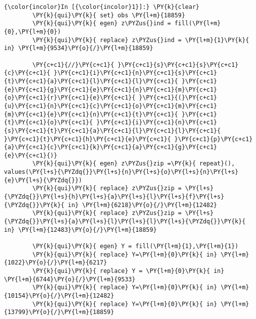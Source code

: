 \documentclass[11pt,notitlepage]{article}\usepackage[]{graphicx}\usepackage[]{color}
\makeatletter
\newenvironment{kframe}{%
 \def\at@end@of@kframe{}%
 \ifinner\ifhmode%
  \def\at@end@of@kframe{\end{minipage}}%
  \begin{minipage}{\columnwidth}%
 \fi\fi%
 \def\FrameCommand##1{\hskip\@totalleftmargin \hskip-\fboxsep
 \colorbox{shadecolor}{##1}\hskip-\fboxsep
     \hskip-\linewidth \hskip-\@totalleftmargin \hskip\columnwidth}%
 \MakeFramed {\advance\hsize-\width
   \@totalleftmargin\z@ \linewidth\hsize
   \@setminipage}}%
 {\par\unskip\endMakeFramed%
 \at@end@of@kframe}
\newenvironment{knitrout}{}{} %
\makeatother
\begin{document}
\begin{enumerate}[a)]
\begin{knitrout}
\color{fgcolor}\begin{kframe}
   \begin{Verbatim}[commandchars=\\\{\}]
{\color{incolor}In [{\color{incolor}1}]:} \PY{k}{clear} 
        \PY{k}{qui}\PY{k}{ set} obs \PY{l+m}{18859}
        \PY{k}{qui}\PY{k}{ egen} z\PYZus{}ind = fill(\PY{l+m}{0},\PY{l+m}{0})
        \PY{k}{qui}\PY{k}{ replace} z\PYZus{}ind = \PY{l+m}{1}\PY{k}{ in} \PY{l+m}{9534}\PY{o}{/}\PY{l+m}{18859}
        
        \PY{c+c1}{//}\PY{c+c1}{ }\PY{c+c1}{s}\PY{c+c1}{s}\PY{c+c1}{c}\PY{c+c1}{ }\PY{c+c1}{i}\PY{c+c1}{n}\PY{c+c1}{s}\PY{c+c1}{t}\PY{c+c1}{a}\PY{c+c1}{l}\PY{c+c1}{l}\PY{c+c1}{ }\PY{c+c1}{e}\PY{c+c1}{g}\PY{c+c1}{e}\PY{c+c1}{n}\PY{c+c1}{m}\PY{c+c1}{o}\PY{c+c1}{r}\PY{c+c1}{e}\PY{c+c1}{ }\PY{c+c1}{(}\PY{c+c1}{u}\PY{c+c1}{n}\PY{c+c1}{c}\PY{c+c1}{o}\PY{c+c1}{m}\PY{c+c1}{m}\PY{c+c1}{e}\PY{c+c1}{n}\PY{c+c1}{t}\PY{c+c1}{ }\PY{c+c1}{t}\PY{c+c1}{o}\PY{c+c1}{ }\PY{c+c1}{i}\PY{c+c1}{n}\PY{c+c1}{s}\PY{c+c1}{t}\PY{c+c1}{a}\PY{c+c1}{l}\PY{c+c1}{l}\PY{c+c1}{ }\PY{c+c1}{t}\PY{c+c1}{h}\PY{c+c1}{e}\PY{c+c1}{ }\PY{c+c1}{p}\PY{c+c1}{a}\PY{c+c1}{c}\PY{c+c1}{k}\PY{c+c1}{a}\PY{c+c1}{g}\PY{c+c1}{e}\PY{c+c1}{)}
        \PY{k}{qui}\PY{k}{ egen} z\PYZus{}zip =\PY{k}{ repeat}(), values(\PY{l+s}{\PYZdq{}}\PY{l+s}{n}\PY{l+s}{o}\PY{l+s}{n}\PY{l+s}{e}\PY{l+s}{\PYZdq{}})
        \PY{k}{qui}\PY{k}{ replace} z\PYZus{}zip = \PY{l+s}{\PYZdq{}}\PY{l+s}{h}\PY{l+s}{a}\PY{l+s}{l}\PY{l+s}{f}\PY{l+s}{\PYZdq{}}\PY{k}{ in} \PY{l+m}{6218}\PY{o}{/}\PY{l+m}{12482}
        \PY{k}{qui}\PY{k}{ replace} z\PYZus{}zip = \PY{l+s}{\PYZdq{}}\PY{l+s}{a}\PY{l+s}{l}\PY{l+s}{l}\PY{l+s}{\PYZdq{}}\PY{k}{ in} \PY{l+m}{12483}\PY{o}{/}\PY{l+m}{18859}
        
        \PY{k}{qui}\PY{k}{ egen} Y = fill(\PY{l+m}{1},\PY{l+m}{1})
        \PY{k}{qui}\PY{k}{ replace} Y=\PY{l+m}{0}\PY{k}{ in} \PY{l+m}{1022}\PY{o}{/}\PY{l+m}{6217}
        \PY{k}{qui}\PY{k}{ replace} Y = \PY{l+m}{0}\PY{k}{ in} \PY{l+m}{6744}\PY{o}{/}\PY{l+m}{9533}
        \PY{k}{qui}\PY{k}{ replace} Y=\PY{l+m}{0}\PY{k}{ in} \PY{l+m}{10154}\PY{o}{/}\PY{l+m}{12482}
        \PY{k}{qui}\PY{k}{ replace} Y=\PY{l+m}{0}\PY{k}{ in} \PY{l+m}{13799}\PY{o}{/}\PY{l+m}{18859}
\end{Verbatim}


\end{kframe}
\end{knitrout}
\end{enumerate}
\end{document}
